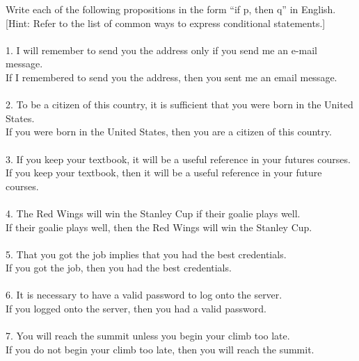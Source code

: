 \documentclass[12pt]{article}
\newenvironment{problem}[2][Problem]{\begin{trivlist}
\item[\hskip \labelsep {\bfseries #1}\hskip \labelsep {\bfseries #2.}]}{\end{trivlist}}
\begin{document}
\begin{problem}{3}
    Write each of the following propositions in the form “if p, then q” in English.
    [Hint: Refer to the list of common ways to express conditional statements.]\\\\
1. I will remember to send you the address only if you send me an e-mail message.\\
If I remembered to send you the address, then you sent me an email message.\\\\
2. To be a citizen of this country, it is sufficient that you were born in the United States.\\
If you were born in the United States, then you are a citizen of this country.\\\\
3. If you keep your textbook, it will be a useful reference in your futures courses.\\
If you keep your textbook, then it will be a useful reference in your future courses.\\\\
4. The Red Wings will win the Stanley Cup if their goalie plays well.\\
If their goalie plays well, then the Red Wings will win the Stanley Cup.\\\\
5. That you got the job implies that you had the best credentials.\\
If you got the job, then you had the best credentials.\\\\
6. It is necessary to have a valid password to log onto the server.\\
If you logged onto the server, then you had a valid password.\\\\
7. You will reach the summit unless you begin your climb too late.\\
If you do not begin your climb too late, then you will reach the summit.
\end{problem}
 
\end{document}
